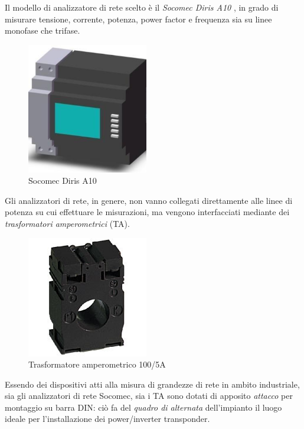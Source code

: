 %
Il modello di analizzatore di rete scelto \`e il \emph{Socomec Diris A10}
\cite{dirisa10}, in grado di misurare tensione, corrente, potenza, power factor 
e frequenza sia su linee monofase che trifase.
%
\begin{figure}[!h]
\centering
\includegraphics[width=150pt]{img/power-transponder.jpg}
\caption{Socomec Diris A10}
\label{power-transpoder}
\end{figure}
%

%
Gli analizzatori di rete, in genere, non vanno collegati direttamente alle linee di 
potenza su cui effettuare le misurazioni, ma vengono interfacciati mediante dei 
\emph{trasformatori amperometrici} (TA).
%
\begin{figure}[!h]
\centering
\includegraphics[width=150pt]{img/ta.jpg}
\caption{Trasformatore amperometrico 100/5A}
\label{ta}
\end{figure}
%

%
Essendo dei dispositivi atti alla misura di grandezze di rete in ambito industriale, 
sia gli analizzatori di rete Socomec, sia i TA sono dotati di apposito \emph{attacco} 
per montaggio su barra DIN: ci\`o fa del \emph{quadro di alternata} dell'impianto 
il luogo ideale per l'installazione dei power/inverter transponder.
%

%
